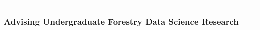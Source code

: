 \documentclass[
  letterpaper,
  DIV=11,
  numbers=noendperiod]{scrartcl}
\begin{document}
\begin{center}\rule{0.5\linewidth}{0.5pt}\end{center}

\hypertarget{advising-undergraduate-forestry-data-science-research}{%
\subsubsection{Advising Undergraduate Forestry Data Science
Research}\label{advising-undergraduate-forestry-data-science-research}}

\begin{figure}

\begin{minipage}[t]{0.50\linewidth}

{\centering 


}

\end{minipage}%
%
\begin{minipage}[t]{0.50\linewidth}

{\centering 


}

\end{minipage}%

\end{figure}
\end{document}

